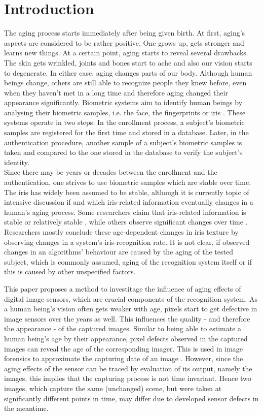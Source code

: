 \documentclass[10pt,twocolumn,letterpaper]{article}
\begin{document}
\section{Introduction}
The aging process starts immediately after being given birth. At first, aging's aspects are considered to be rather positive. One grows up, gets stronger and learns new things. At a certain point, aging starts to reveal several drawbacks. The skin gets wrinkled, joints and bones start to ache and also our vision starts to degenerate. In either case, aging changes parts of our body. Although human beings change, others are still able to recognize people they knew before, even when they haven't met in a long time and therefore aging changed their appearance significantly.
Biometric systems aim to identify human beings by analysing their biometric samples, i.e. the face, the fingerprints or iris \cite{rathgeb}. These systems operate in two steps. In the enrollment process, a subject's biometric samples are registered for the first time and stored in a database. Later, in the authentication procedure, another sample of a subject's biometric samples is taken and compared to the one stored in the database to verify the subject's identity. \\
Since there may be years or decades between the enrollment and the authentication, one strives to use biometric samples which are stable over time. The iris has widely been assumed to be stable, although it is currently topic of intensive discussion if and which iris-related information eventually changes in a human's aging process. Some researchers claim that iris-related information is stable or relatively stable \cite{daugmanPatent, daugmanNoChange, grotherStability, monroDCTIris}, while others observe significant changes over time \cite{rankinChange, rankinChangeResponse, fenkerIrisAging, czajkaTemplateAging, fairhurstNonstability}. Researchers mostly conclude these age-dependent changes in iris texture by observing changes in a system's iris-recognition rate. It is not clear, if observed changes in an algorithms' behaviour are caused by the aging of the tested subject, which is commonly assumed, aging of the recognition system itself or if this is caused by other unspecified factors.

This paper proposes a method to investitage the influence of aging effects of digital image sensors, which are crucial components of the recognition system. As a human being's vision often gets weaker with age, pixels start to get defective in image sensors over the years as well. This influences the quality - and therefore the appearance - of the captured images. Similar to being able to estimate a human being's age by their appearance, pixel defects observed in the captured images can reveal the age of the corresponding imager. This is used in image forensics to approximate the capturing date of an image \cite{fridrich}. However, since the aging effects of the sensor can be traced by evaluation of its output, namely the images, this implies that the capturing process is not time invariant. Hence two images, which capture the same (unchanged) scene, but were taken at significantly different points in time, may differ due to developed sensor defects in the meantime.
\end{document}

